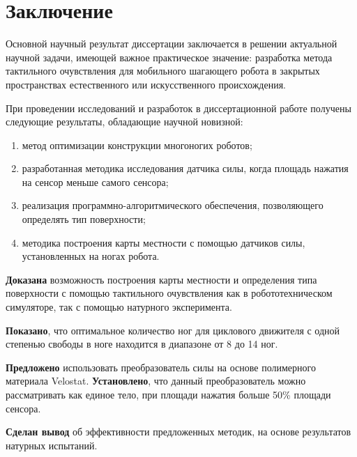 \chapter*{Заключение}                       %


Основной  научный  результат  диссертации  заключается  в  решении  актуальной 
научной  задачи,  имеющей  важное  практическое  значение: разработка метода тактильного очувствления для мобильного шагающего робота в закрытых пространствах естественного или искусственного происхождения. 

При  проведении  исследований  и  разработок  в  диссертационной  работе  получены 
следующие результаты, обладающие научной новизной:
\begin{enumerate}
  \item метод оптимизации конструкции многоногих роботов;
  \item разработанная методика исследования датчика силы, когда площадь нажатия на сенсор меньше самого сенсора;
  \item реализация программно-алгоритмического обеспечения, позволяющего определять тип поверхности;
  \item методика построения карты местности с помощью датчиков силы, установленных на ногах робота.
\end{enumerate}

\textbf{Доказана} возможность построения карты местности и определения типа поверхности с помощью тактильного очувствления как в робототехническом симуляторе, так с помощью натурного эксперимента.

\textbf{Показано}, что оптимальное количество ног для циклового движителя с одной степенью свободы в ноге находится в диапазоне от 8 до 14 ног. 

\textbf{Предложено} использовать преобразователь силы на основе полимерного материала Velostat. \textbf{Установлено}, что данный преобразователь можно рассматривать как единое тело, при площади нажатия больше 50\% площади сенсора. 

\textbf{Сделан вывод} об эффективности предложенных методик, на основе результатов натурных испытаний.
